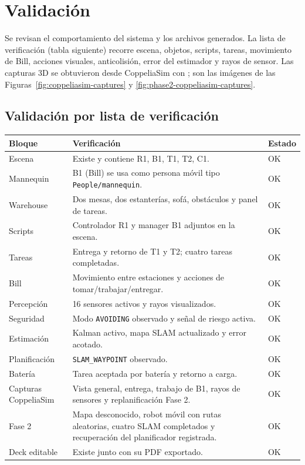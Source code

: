 \chapter{Validación}

Se revisan el comportamiento del sistema y los archivos generados. La lista de
verificación (tabla siguiente) recorre escena, objetos, scripts, tareas,
movimiento de Bill, acciones visuales, anticolisión, error del estimador y rayos
de sensor. Las capturas 3D se obtuvieron desde CoppeliaSim con
; son las imágenes de las
Figuras~\ref{fig:coppeliasim-captures} y
\ref{fig:phase2-coppeliasim-captures}.

\section{Validación por lista de verificación}

\begingroup
\footnotesize
\setlength{\tabcolsep}{3pt}
\begin{longtable}{P{0.40\textwidth}P{0.45\textwidth}P{0.08\textwidth}}
\toprule
\textbf{Bloque} & \textbf{Verificación} & \textbf{Estado}\\
\midrule
\endhead
Escena & Existe  y contiene R1, B1, T1, T2, C1. & OK\\
Mannequin & B1 (Bill) se usa como persona móvil tipo \texttt{People/mannequin}. & OK\\
Warehouse & Dos mesas, dos estanterías, sofá, obstáculos y panel de tareas. & OK\\
Scripts & Controlador R1 y manager B1 adjuntos en la escena. & OK\\
Tareas & Entrega y retorno de T1 y T2; cuatro tareas completadas. & OK\\
Bill & Movimiento entre estaciones y acciones de tomar/trabajar/entregar. & OK\\
Percepción & 16 sensores activos y rayos visualizados. & OK\\
Seguridad & Modo \texttt{AVOIDING} observado y señal de riesgo activa. & OK\\
Estimación & Kalman activo, mapa SLAM actualizado y error acotado. & OK\\
Planificación & \texttt{SLAM\_WAYPOINT} observado. & OK\\
Batería & Tarea aceptada por batería y retorno a carga. & OK\\
Capturas CoppeliaSim & Vista general, entrega, trabajo de B1, rayos de sensores y replanificación Fase 2. & OK\\
Fase 2 & Mapa desconocido, robot móvil con rutas aleatorias, cuatro SLAM completados y recuperación del planificador registrada. & OK\\
Deck editable & Existe  junto con su PDF exportado. & OK\\
\bottomrule
\end{longtable}
\endgroup

